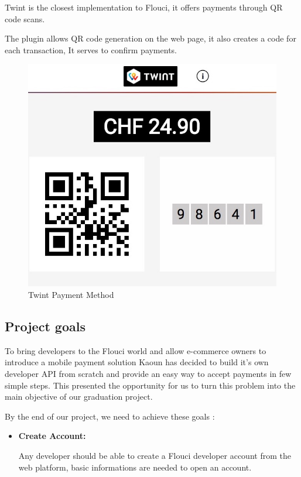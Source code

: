 \begin{spacing}{1.2}
\begin{itemize}
Twint is the closest implementation to Flouci, it offers payments through QR code scans.

The plugin allows QR code generation on the web page, it also creates a code for each transaction, It serves to confirm payments.
\begin{figure}[!ht]\centering
\includegraphics[scale=0.3]{images/twint.jpg}
\caption{Twint Payment Method}
\label{fig:fig1}
\end{figure}
  \end{itemize}

\subsection{Project goals}
To bring developers to the Flouci world and allow e-commerce owners to introduce a mobile payment solution Kaoun has decided to build it's own developer API from scratch and provide an easy way to accept payments in few simple steps. This presented the opportunity for us to turn this problem into the main objective of our graduation project.

By the end of our project, we need to achieve these goals :
\begin{itemize}
  \item \textbf{Create Account:}
  
  Any developer should be able to create a Flouci developer account from the web platform, basic informations are needed to open an account.
  

\end{itemize}
\end{spacing}
